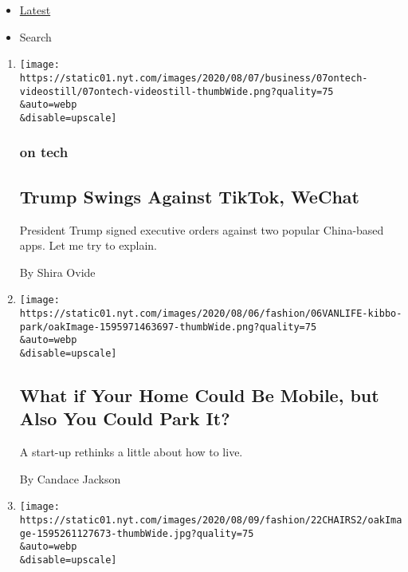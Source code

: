 \begin{itemize}
\tightlist
\item
  \protect\hyperlink{stream-panel}{Latest}
\item
  Search
\end{itemize}

\begin{enumerate}
\def\labelenumi{\arabic{enumi}.}
\item
  \href{/2020/08/07/technology/trump-tiktok-wechat.html}{}

  \texttt{[image: https://static01.nyt.com/images/2020/08/07/business/07ontech-videostill/07ontech-videostill-thumbWide.png?quality=75\\\&auto=webp\\\&disable=upscale]}

  \hypertarget{on-tech}{%
  \subsubsection{on tech}\label{on-tech}}

  \hypertarget{trump-swings-against-tiktok-wechat}{%
  \subsection{Trump Swings Against TikTok,
  WeChat}\label{trump-swings-against-tiktok-wechat}}

  President Trump signed executive orders against two popular
  China-based apps. Let me try to explain.

  By Shira Ovide
\item
  \href{/2020/08/07/style/kibbo-van-life-startup.html}{}

  \texttt{[image: https://static01.nyt.com/images/2020/08/06/fashion/06VANLIFE-kibbo-park/oakImage-1595971463697-thumbWide.png?quality=75\\\&auto=webp\\\&disable=upscale]}

  \hypertarget{what-if-your-home-could-be-mobile-but-also-you-could-park-it}{%
  \subsection{What if Your Home Could Be Mobile, but Also You Could Park
  It?}\label{what-if-your-home-could-be-mobile-but-also-you-could-park-it}}

  A start-up rethinks a little about how to live.

  By Candace Jackson
\item
  \href{/2020/08/07/style/gamer-chair-market-herman-miller.html}{}

  \texttt{[image: https://static01.nyt.com/images/2020/08/09/fashion/22CHAIRS2/oakImage-1595261127673-thumbWide.jpg?quality=75\\\&auto=webp\\\&disable=upscale]}


\end{enumerate}
